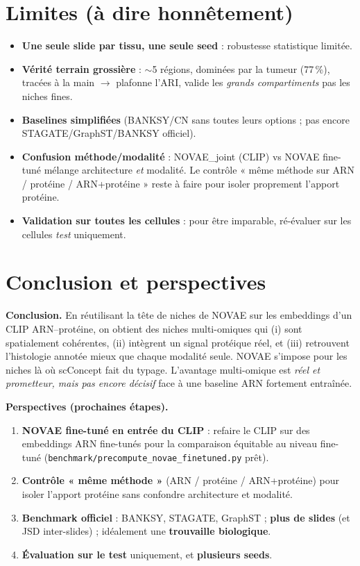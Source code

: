 \documentclass[11pt,a4paper]{article}
\begin{document}
\section{Limites (à dire honnêtement)}
\begin{itemize}[noitemsep]
  \item \textbf{Une seule slide par tissu, une seule seed} : robustesse statistique limitée.
  \item \textbf{Vérité terrain grossière} : $\sim$5 régions, dominées par la tumeur (77\,\%),
        tracées à la main $\rightarrow$ plafonne l'ARI, valide les \emph{grands compartiments}
        pas les niches fines.
  \item \textbf{Baselines simplifiées} (BANKSY/CN sans toutes leurs options ; pas encore
        STAGATE/GraphST/BANKSY officiel).
  \item \textbf{Confusion méthode/modalité} : NOVAE\_joint (CLIP) vs NOVAE fine-tuné mélange
        architecture \emph{et} modalité. Le contrôle « même méthode sur ARN / protéine /
        ARN+protéine » reste à faire pour isoler proprement l'apport protéine.
  \item \textbf{Validation sur toutes les cellules} : pour être imparable, ré-évaluer sur les
        cellules \emph{test} uniquement.
\end{itemize}

\section{Conclusion et perspectives}
\textbf{Conclusion.} En réutilisant la tête de niches de NOVAE sur les embeddings d'un CLIP
ARN--protéine, on obtient des niches multi-omiques qui (i) sont spatialement cohérentes,
(ii) intègrent un signal protéique réel, et (iii) retrouvent l'histologie annotée mieux que
chaque modalité seule. NOVAE s'impose pour les niches là où scConcept fait du typage.
L'avantage multi-omique est \emph{réel et prometteur, mais pas encore décisif} face à une
baseline ARN fortement entraînée.

\medskip
\noindent\textbf{Perspectives (prochaines étapes).}
\begin{enumerate}[noitemsep]
  \item \textbf{NOVAE fine-tuné en entrée du CLIP} : refaire le CLIP sur des embeddings ARN
        fine-tunés pour la comparaison équitable au niveau fine-tuné
        (\texttt{benchmark/precompute\_novae\_finetuned.py} prêt).
  \item \textbf{Contrôle « même méthode »} (ARN / protéine / ARN+protéine) pour isoler
        l'apport protéine sans confondre architecture et modalité.
  \item \textbf{Benchmark officiel} : BANKSY, STAGATE, GraphST ; \textbf{plus de slides}
        (et JSD inter-slides) ; idéalement une \textbf{trouvaille biologique}.
  \item \textbf{Évaluation sur le test} uniquement, et \textbf{plusieurs seeds}.
\end{enumerate}
\end{document}

